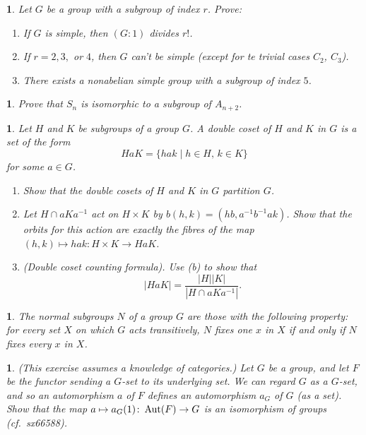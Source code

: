 \documentclass[a4paper,11pt,final,openany]{memoir}%
\newtheorem{exercise}[Y]{}
\theoremstyle{nonumberplain}
\begin{document}
\begin{exercise}
\label{x32} Let $G$ be a group with a subgroup of index $r$. Prove:

\begin{enumerate}
\item If $G$ is simple, then $(G:1)$ divides $r!$.

\item If $r=2,3,$ or $4$, then $G$ can't be simple (except for te trivial
cases $C_{2}$, $C_{3}$).

\item There exists a nonabelian simple group with a subgroup of index $5$.
\end{enumerate}
\end{exercise}

\begin{exercise}
\label{x33} Prove that $S_{n}$ is isomorphic to a subgroup of $A_{n+2}$.
\end{exercise}

\begin{exercise}
\label{x33b}Let $H$ and $K$ be subgroups of a group $G$. A \emph{double coset}
of $H$ and $K$ in $G$ is a set of the form%
\[
HaK=\{hak\mid h\in H\text{, }k\in K\}
\]
for some $a\in G$.

\begin{enumerate}
\item Show that the double cosets of $H$ and $K$ in $G$ partition $G$.

\item Let $H\cap aKa^{-1}$ act on $H\times K$ by $b(h,k)=(hb,a^{-1}b^{-1}ak)$.
Show that the orbits for this action are exactly the fibres of the map
$(h,k)\mapsto hak\colon H\times K\rightarrow HaK$.

\item (Double coset counting formula). Use (b) to show that%
\[
|HaK|=\frac{|H||K|}{|H\cap aKa^{-1}|}.
\]

\end{enumerate}
\end{exercise}

\begin{exercise}
\label{x33c}The normal subgroups $N$ of a group $G$ are those with the
following property: for every set $X$ on which $G$ acts transitively, $N$
fixes one $x$ in $X$ if and only if $N$ fixes every $x$ in $X$.
\end{exercise}

\begin{exercise}
\label{x33d}(This exercise assumes a knowledge of categories.) Let $G$ be a
group, and let $F$ be the functor sending a $G$-set to its underlying set. We
can regard $G$ as a $G$-set, and so an automorphism $a$ of $F$ defines an
automorphism $a_{G}$ of $G$ (as a set). Show that the map $a\mapsto
a_{G}(1)\colon\operatorname{Aut}(F)\rightarrow G$ is an isomorphism of groups (cf.\ sx66588).
\end{exercise}
\end{document}

